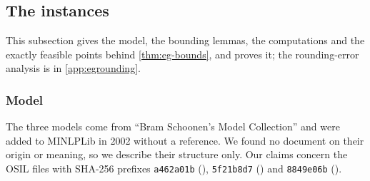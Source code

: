 \subsection{The  instances}\label{app:eg}

This subsection gives the model, the bounding lemmas, the computations and the exactly feasible points behind \cref{thm:eg-bounds}, and proves it; the rounding-error analysis is in \cref{app:egrounding}.

\subsubsection{Model}\label{app:eg-model}

The three models come from ``Bram Schoonen's Model Collection'' and were added to MINLPLib in 2002 without a reference.
We found no document on their origin or meaning, so we describe their structure only.
Our claims concern the OSIL files with SHA-256 prefixes \texttt{a462a01b} (), \texttt{5f21b8d7} () and \texttt{8849e06b} ().

